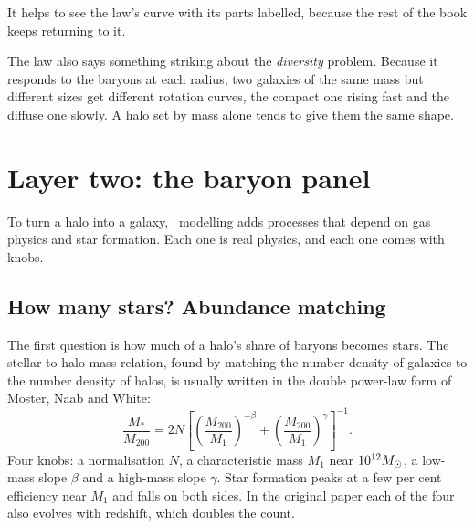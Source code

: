 It helps to see the law's curve with its parts labelled, because the rest of the book keeps returning to it.





The law also says something striking about the \emph{diversity} problem. Because it responds to the baryons at each radius, two galaxies of the same mass but different sizes get different rotation curves, the compact one rising fast and the diffuse one slowly. A halo set by mass alone tends to give them the same shape.





\section{Layer two: the baryon panel}

To turn a halo into a galaxy, \LCDM\ modelling adds processes that depend on gas physics and star formation. Each one is real physics, and each one comes with knobs.

\subsection{How many stars? Abundance matching}

The first question is how much of a halo's share of baryons becomes stars. The stellar-to-halo mass relation, found by matching the number density of galaxies to the number density of halos, is usually written in the double power-law form of Moster, Naab and White:
\begin{equation}
\frac{M_*}{M_{200}}=2N\left[\left(\frac{M_{200}}{M_1}\right)^{-\beta}+\left(\frac{M_{200}}{M_1}\right)^{\gamma}\right]^{-1}.
\end{equation}
Four knobs: a normalisation $N$, a characteristic mass $M_1$ near $10^{12}M_\odot$, a low-mass slope $\beta$ and a high-mass slope $\gamma$. Star formation peaks at a few per cent efficiency near $M_1$ and falls on both sides. In the original paper each of the four also evolves with redshift, which doubles the count.


